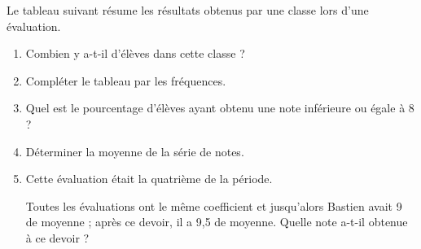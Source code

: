 \begin{Maquette}[Fiche,CorrigeFin,Colonnes=2]{}
\begin{multicols}{2}
      
      \begin{exercice}[Dur] %
         Le tableau suivant résume les résultats obtenus par une classe lors d'une évaluation. \par \medskip
            {\small 
             }
         \begin{enumerate}
            \item Combien y a-t-il d'élèves dans cette classe ?
            \item Compléter le tableau par les fréquences.
            \item Quel est le pourcentage d'élèves ayant obtenu une note inférieure ou égale à 8 ?
            \item Déterminer la moyenne de la série de notes.
            \item Cette évaluation était la quatrième de la période. \par
               Toutes les évaluations ont le même coefficient et jusqu'alors Bastien avait 9 de moyenne ; après ce devoir, il a 9,5 de moyenne. Quelle note a-t-il obtenue à ce devoir ? 
         \end{enumerate}
      \end{exercice}


\end{multicols}
\end{Maquette}
